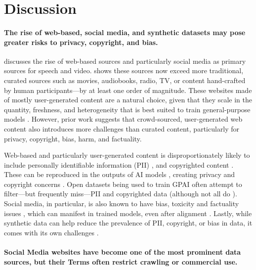 \section{Discussion}
\label{sec:discussion}

\vspace{-2mm}
\paragraph{The rise of web-based, social media, and synthetic datasets may pose greater risks to privacy, copyright, and bias.}
 discusses the rise of web-based sources and particularly social media as primary sources for speech and video.
 shows these sources now exceed more traditional, curated sources such as movies, audiobooks, radio, TV, or content hand-crafted by human participants---by at least one order of magnitude.
These websites made of mostly user-generated content are a natural choice, given that they scale in the quantity, freshness, and heterogeneity that is best suited to train general-purpose models \citep{longpre2023pretrainers,aghajanyan2023scaling}.
However, prior work suggests that crowd-sourced, user-generated web content also introduces more challenges than curated content, particularly for privacy, copyright, bias, harm, and factuality.

Web-based and particularly user-generated content is disproportionately likely to include personally identifiable information (PII) \cite{Luccioni2021-iq,Subramani2023-gj,elazars}, and copyrighted content \citep{meese2019mundane,lee2023talkin}.
These can be reproduced in the outputs of AI models \citep{Carlini2022-nk,Chen2023-lw}, creating privacy and copyright concerns \citep{Zhang2023-ln}. 
Open datasets being used to train GPAI often attempt to filter---but frequently miss---PII and copyrighted data \citep{soldaini2024dolma,Subramani2023-gj} (although not all do \citep{Penedo2023-cr}). 
Social media, in particular, is also known to have bias, toxicity and factuality issues \citep{olteanu2019social}, which can manifest in trained models, even after alignment \citep{kotha2023understanding}.
Lastly, while synthetic data can help reduce the prevalence of PII, copyright, or bias in data, it comes with its own challenges \citep{Kurakin2023-ip,Liu2024-ga}.

\vspace{-2mm}
\paragraph{Social Media websites have become one of the most prominent data sources, but their Terms often restrict crawling or commercial use.}

